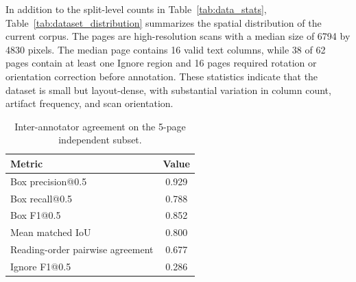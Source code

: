 \documentclass[12pt]{article}
\begin{document}
\begin{table}[t]
\centering
\caption{Dataset distribution statistics computed over the 62-page corpus. Width, height, and bounding-box dimensions are measured in pixels.}
\label{tab:dataset_distribution}
\end{table}

In addition to the split-level counts in Table~\ref{tab:data_stats}, Table~\ref{tab:dataset_distribution} summarizes the spatial distribution of the current corpus. The pages are high-resolution scans with a median size of 6794 by 4830 pixels. The median page contains 16 valid text columns, while 38 of 62 pages contain at least one Ignore region and 16 pages required rotation or orientation correction before annotation. These statistics indicate that the dataset is small but layout-dense, with substantial variation in column count, artifact frequency, and scan orientation.

\begin{table}[t]
\centering
\caption{Inter-annotator agreement on the 5-page independent subset.}
\label{tab:iaa}
\begin{tabular}{lc}
\toprule
Metric & Value \\
\midrule
Box precision@0.5 & 0.929 \\
Box recall@0.5 & 0.788 \\
Box F1@0.5 & 0.852 \\
Mean matched IoU & 0.800 \\
Reading-order pairwise agreement & 0.677 \\
Ignore F1@0.5 & 0.286 \\
\bottomrule
\end{tabular}
\end{table}
\end{document}
